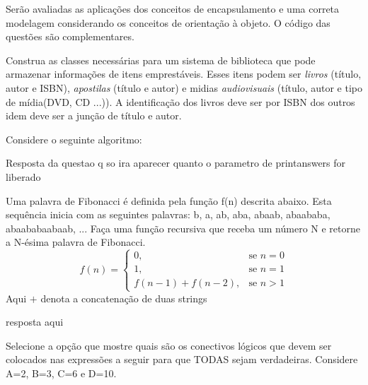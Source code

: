 \documentclass{exam}
\begin{document}
    
        
    
        \begin{center}
            \gradetable[h][questions]
        \end{center}
    
        Serão avaliadas as aplicações dos conceitos de encapsulamento e uma correta modelagem considerando os conceitos de orientação à objeto.
        O código das questões são complementares.
        \begin{questions}
            \question[10] Construa as classes necessárias para um sistema de biblioteca que pode armazenar informações de itens emprestáveis. Esses itens podem ser \textit{livros} (título, autor e ISBN), \textit{apostilas} (título e autor) e midias \textit{audiovisuais} (título, autor e tipo de mídia(DVD, CD ...)).  A identificação dos livros deve ser por ISBN dos outros idem deve ser a junção de título e autor.

            \newpage
            \question[75]Considere o seguinte algoritmo: 
            
            \begin{solutionorlines}[\stretch{1}]
                Resposta da questao q so ira aparecer quanto o parametro de printanswers for liberado
            \end{solutionorlines}	

            \question[25] Uma palavra de Fibonacci é definida pela função f(n) descrita abaixo. Esta sequência inicia com as seguintes palavras: b, a, ab, aba, abaab, abaababa, abaababaabaab, ... Faça uma função recursiva que receba um número N e retorne a N-ésima palavra de Fibonacci. 
            $$
             f(n)=\begin{cases}
                0, & \text{se $n=0$}\\
                1, & \text{se $n=1$}\\
                f(n-1) + f(n-2) , & \text{se $n>1$}
              \end{cases}
            $$
            Aqui $+$ denota a concatenação de duas strings
            
            \begin{solutionorlines}[\stretch{1}]
                resposta aqui	
            \end{solutionorlines}
            
            \newpage		
            \question[10] Selecione a opção que mostre quais são os conectivos lógicos que devem ser colocados nas expressões a seguir para que TODAS sejam verdadeiras. Considere A=2, B=3, C=6 e D=10.
            

\end{questions}
\end{document}
